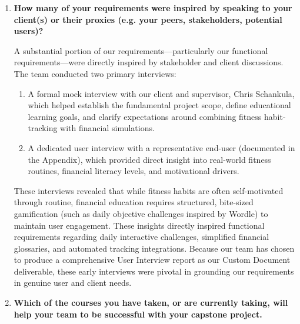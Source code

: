 \documentclass[12pt]{article}
\begin{document}
\begin{enumerate}
  \item \textbf{How many of your requirements were inspired by speaking to your client(s) or their proxies (e.g. your peers, stakeholders, potential users)?}

  A substantial portion of our requirements---particularly our functional requirements---were directly inspired by stakeholder and client discussions. The team conducted two primary interviews:
  \begin{enumerate}
    \item A formal mock interview with our client and supervisor, Chris Schankula, which helped establish the fundamental project scope, define educational learning goals, and clarify expectations around combining fitness habit-tracking with financial simulations.
    \item A dedicated user interview with a representative end-user (documented in the Appendix), which provided direct insight into real-world fitness routines, financial literacy levels, and motivational drivers.
  \end{enumerate}
  These interviews revealed that while fitness habits are often self-motivated through routine, financial education requires structured, bite-sized gamification (such as daily objective challenges inspired by Wordle) to maintain user engagement. These insights directly inspired functional requirements regarding daily interactive challenges, simplified financial glossaries, and automated tracking integrations. Because our team has chosen to produce a comprehensive User Interview report as our Custom Document deliverable, these early interviews were pivotal in grounding our requirements in genuine user and client needs.

  \item \textbf{Which of the courses you have taken, or are currently taking, will help your team to be successful with your capstone project.}


\end{enumerate}
\end{document}
